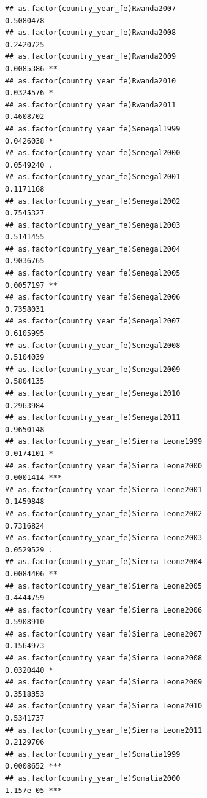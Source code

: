 \documentclass[
  a4paper,
]{article}
\begin{document}
\begin{verbatim}
## as.factor(country_year_fe)Rwanda2007                           0.5080478    
## as.factor(country_year_fe)Rwanda2008                           0.2420725    
## as.factor(country_year_fe)Rwanda2009                           0.0085386 ** 
## as.factor(country_year_fe)Rwanda2010                           0.0324576 *  
## as.factor(country_year_fe)Rwanda2011                           0.4608702    
## as.factor(country_year_fe)Senegal1999                          0.0426038 *  
## as.factor(country_year_fe)Senegal2000                          0.0549240 .  
## as.factor(country_year_fe)Senegal2001                          0.1171168    
## as.factor(country_year_fe)Senegal2002                          0.7545327    
## as.factor(country_year_fe)Senegal2003                          0.5141455    
## as.factor(country_year_fe)Senegal2004                          0.9036765    
## as.factor(country_year_fe)Senegal2005                          0.0057197 ** 
## as.factor(country_year_fe)Senegal2006                          0.7358031    
## as.factor(country_year_fe)Senegal2007                          0.6105995    
## as.factor(country_year_fe)Senegal2008                          0.5104039    
## as.factor(country_year_fe)Senegal2009                          0.5804135    
## as.factor(country_year_fe)Senegal2010                          0.2963984    
## as.factor(country_year_fe)Senegal2011                          0.9650148    
## as.factor(country_year_fe)Sierra Leone1999                     0.0174101 *  
## as.factor(country_year_fe)Sierra Leone2000                     0.0001414 ***
## as.factor(country_year_fe)Sierra Leone2001                     0.1459848    
## as.factor(country_year_fe)Sierra Leone2002                     0.7316824    
## as.factor(country_year_fe)Sierra Leone2003                     0.0529529 .  
## as.factor(country_year_fe)Sierra Leone2004                     0.0084406 ** 
## as.factor(country_year_fe)Sierra Leone2005                     0.4444759    
## as.factor(country_year_fe)Sierra Leone2006                     0.5908910    
## as.factor(country_year_fe)Sierra Leone2007                     0.1564973    
## as.factor(country_year_fe)Sierra Leone2008                     0.0320440 *  
## as.factor(country_year_fe)Sierra Leone2009                     0.3518353    
## as.factor(country_year_fe)Sierra Leone2010                     0.5341737    
## as.factor(country_year_fe)Sierra Leone2011                     0.2129706    
## as.factor(country_year_fe)Somalia1999                          0.0008652 ***
## as.factor(country_year_fe)Somalia2000                          1.157e-05 ***

\end{verbatim}
\end{document}
